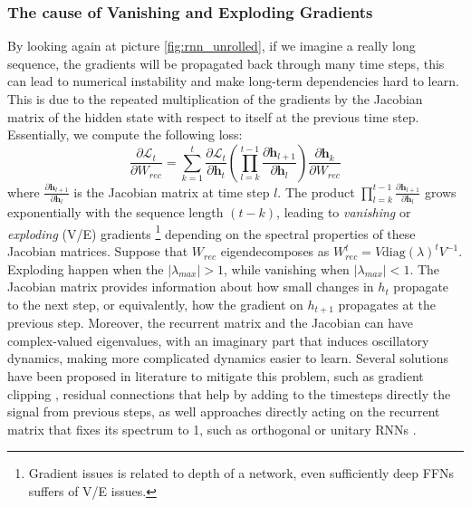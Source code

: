 \subsubsection{The cause of Vanishing and Exploding Gradients}
By looking again at picture \ref{fig:rnn_unrolled},
if we imagine a really long sequence, the gradients will be propagated back through many time steps, this can lead to numerical instability and make long-term dependencies hard to learn.
This is due to the repeated multiplication of the gradients by the Jacobian matrix of the hidden state with respect to itself at the previous time step.
Essentially, we compute the following loss:
\begin{equation}
    \frac{\partial \mathcal{L}_t}{\partial W_{rec}} = \sum_{k=1}^{t} \frac{\partial \mathcal{L}_t}{\partial \mathbf{h}_t} \left(\prod_{l=k}^{t-1} \frac{\partial \mathbf{h}_{l+1}}{\partial \mathbf{h}_l}\right) \frac{\partial \mathbf{h}_k}{\partial W_{rec}}
\end{equation}
where $\frac{\partial \mathbf{h}_{l+1}}{\partial \mathbf{h}_l}$ is the Jacobian matrix at time step $l$. The product $\prod_{l=k}^{t-1} \frac{\partial \mathbf{h}_{l+1}}{\partial \mathbf{h}_l}$ grows exponentially with the sequence length $(t-k)$, 
leading to \textit{vanishing} or \textit{exploding} (V/E) gradients \footnote{Gradient issues is related to depth of a network, even sufficiently deep FFNs suffers of V/E issues.} \cite[pag. 290, Ch 8.2]{lecun2015deep} depending on the spectral properties of these Jacobian matrices.
Suppose that $W_{rec}$ eigendecomposes as $W_{rec}^t = V \text{diag}({\lambda})^t V^{-1}$.
Exploding happen when the $|\lambda_{max}| > 1$, while vanishing when $|\lambda_{max}| < 1$.
The Jacobian matrix provides information about how small changes in $h_t$ propagate to the next step, or equivalently, how the gradient on $h_{t+1}$ propagates at the previous step.
Moreover, the recurrent matrix and the Jacobian can have complex-valued eigenvalues, with an imaginary part that induces oscillatory dynamics, making more complicated dynamics easier to learn. 
\newline
Several solutions have been proposed in literature to mitigate this problem, such as gradient clipping  \cite{pmlr-v28-pascanu13},
residual connections \cite{he2015deepresiduallearningimage} that help by adding to the timesteps directly the signal from previous steps, as well approaches directly acting on the recurrent 
matrix that fixes its spectrum to 1, such as orthogonal or unitary RNNs \cite{pmlr-v48-arjovsky16} \cite{le2015simplewayinitializerecurrent}.
